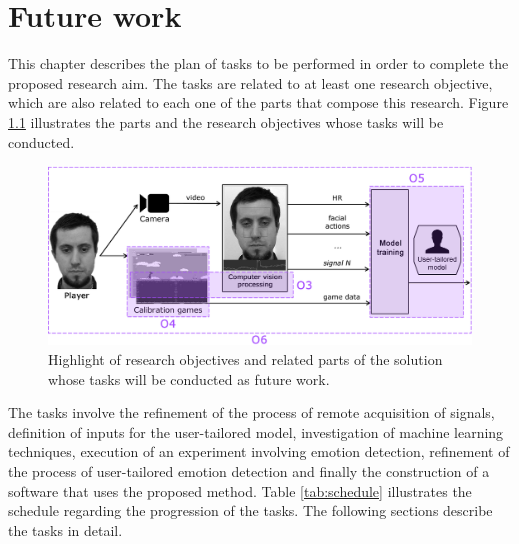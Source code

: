 \chapter{Future work}
\label{ch:closing}

This chapter describes the plan of tasks to be performed in order to complete the proposed research aim. The tasks are related to at least one research objective, which are also related to each one of the parts that compose this research. Figure \ref{fig:future-work-objectives} illustrates the parts and the research objectives whose tasks will be conducted.

\begin{figure}[h]
    \centering
    \includegraphics[width=\textwidth]{figures/future-work-objectives.png}
    \caption{Highlight of research objectives and related parts of the solution whose tasks will be conducted as future work.}
    \label{fig:future-work-objectives}
\end{figure}

The tasks involve the refinement of the process of remote acquisition of signals, definition of inputs for the user-tailored model, investigation of machine learning techniques, execution of an experiment involving emotion detection, refinement of the process of user-tailored emotion detection and finally the construction of a software that uses the proposed method. Table \ref{tab:schedule} illustrates the schedule regarding the progression of the tasks. The following sections describe the tasks in detail.

